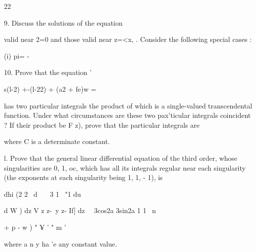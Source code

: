  22

9. Discuss the solutions of the equation

valid near 2=0 and those valid near z=<x, . Consider the following
special cases :

(i) pi= -%

10. Prove that the equation '

s(l-2) +-(l-22) + (a2 + fe)w =

has two particular integrals the product of which is a single-valued
transcendental function. Under what circumstances are these two
pax'ticular integrals coincident ? If their product be F z), prove
that the particular integrals are

where C is a determinate constant.

l. Prove that the general linear differential equation of the third
order, whose singularities are 0, 1, oc, which has all its integrals
regular near each singularity (the exponents at each singularity being
1, 1, - 1), is

dhi (2 2 \ d \ \ \ 3 1 \ "1 du

d W ) dz V z z-\ y z- If] dz \ \ 3cos2a 3sin2a 1 1 \ n

+ p - w ) " ¥ ' " m '

where a n y ha 'e any constant value. 
